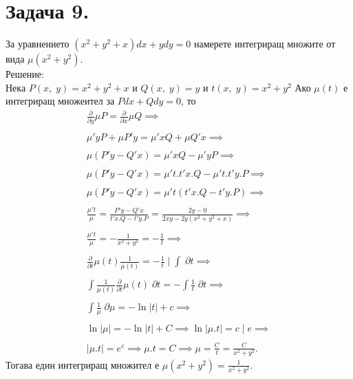 \documentclass[a4paper, 12pt, oneside]{article}
\begin{document}
\section{Задача 9.}
За уравнението $(x^2 + y^2 + x)dx + ydy = 0$ намерете интегриращ множите от вида $\mu(x^2 + y^2)$. \\

Решение: \\
Нека $P(x, \; y) = x^2 + y^2 + x$ и $Q(x, \; y) = y$ и $t(x, \; y) = x^2 + y^2$
Ако $\mu(t)$ е интегриращ множеител за $Pdx + Qdy = 0$, то
\begin{align*}
    \frac{\partial}{\partial y}\mu P =  \frac{\partial}{\partial x}\mu Q \implies \\\\
    \mu'yP + \mu P'y = \mu'xQ + \mu Q'x \implies \\\\
    \mu(P'y - Q'x) = \mu'xQ - \mu'yP \implies \\\\
    \mu(P'y - Q'x) = \mu't.t'x.Q - \mu't.t'y.P \implies \\\\
    \mu(P'y - Q'x) = \mu't(t'x.Q - t'y.P) \implies \\\\
    \frac{\mu't}{\mu} = \frac{P'y - Q'x}{t'x.Q - t'y.P} = \frac{2y - 0}{2xy - 2y(x^2 + y^2 + x)} \implies \\\\
    \frac{\mu't}{\mu} = -\frac{1}{x^2 + y^2} = -\frac{1}{t} \implies \\\\
    \frac{\partial}{\partial t}\mu(t) \frac{1}{\mu(t)} = -\frac{1}{t} \; \Big| \; \displaystyle\int \; \partial t \implies \\\\
    \displaystyle\int \frac{1}{\mu(t)} \frac{\partial}{\partial t}\mu(t) \; \partial t = -\displaystyle\int \frac{1}{t}\; \partial t \implies \\\\
    \displaystyle\int \frac{1}{\mu} \; \partial \mu = -\ln |t| + c \implies \\\\
    \ln|\mu| = - \ln|t| + C \implies \ln|\mu.t| = c \; | \; e \implies \\\\
    |\mu.t| = e^c \implies \mu.t = C \implies \mu = \frac{C}{t} = \frac{C}{x^2 + y^2}.
\end{align*}
Тогава един интегриращ множител е $\mu(x^2 + y^2) = \displaystyle\frac{1}{x^2 + y^2}$.
\end{document}
